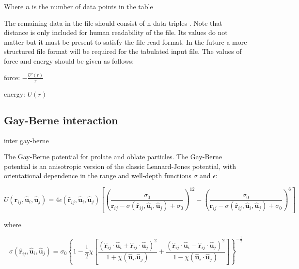 Where $n$ is the number of data points in the table

The remaining data in the file should consist of n data triples
  . Note that distance is only
included for human readability of the file. Its values do not matter
but it must be present to satisfy the file read format. In the future
a more structured file format will be required for the tabulated input
file. The values of force and energy should be given as follows:

force: $-\frac{U'(r)}{r}$

energy: $U(r)$

\subsection{Gay-Berne interaction}

\begin{essyntax}
  inter   gay-berne
     
     
\end{essyntax}

The Gay-Berne potential for prolate and oblate particles. The
Gay-Berne potential is an anisotropic version of the classic
Lennard-Jones potential, with orientational dependence in the range
and well-depth functions $\sigma$ and $\epsilon$:

\[ U(\mathbf{r}_{ij}, \mathbf{\hat{u}}_i, \mathbf{\hat{u}}_j) = 4
\epsilon(\mathbf{\hat{r}}_{ij}, \mathbf{\hat{u}}_i,
\mathbf{\hat{u}}_j) \left[ \left(\frac
    {\sigma_0}{\mathbf{r}_{ij}-\sigma(\mathbf{\hat{r}}_{ij},
      \mathbf{\hat{u}}_i, \mathbf{\hat{u}}_j)+\sigma_0}\right)^{12}-
  \left(\frac {\sigma_0}{\mathbf{r}_{ij}-\sigma(\mathbf{\hat{r}}_{ij},
      \mathbf{\hat{u}}_i, \mathbf{\hat{u}}_j)+\sigma_0}\right)^{6}
\right] \]

where

\[ \sigma( \mathbf{\hat{r}}_{ij}, \mathbf{\hat{u}}_i,
\mathbf{\hat{u}}_j) = \sigma_{0} \left\{ 1 - \frac{1}{2} \chi \left[
    \frac{ \left( \mathbf{\hat{r}}_{ij} \cdot \mathbf{\hat{u}}_i +
        \mathbf{\hat{r}}_{ij} \cdot \mathbf{\hat{u}}_j \right)^{2} }
    {1 + \chi \left( \mathbf{\hat{u}}_i.\mathbf{\hat{u}}_j \right) } +
    \frac{ \left( \mathbf{\hat{r}}_{ij} \cdot \mathbf{\hat{u}}_i -
        \mathbf{\hat{r}}_{ij} \cdot \mathbf{\hat{u}}_j \right)^{2} }
    {1 - \chi \left( \mathbf{\hat{u}}_i \cdot \mathbf{\hat{u}}_j
      \right) } \right] \right\}^{-\frac{1}{2}} \]

